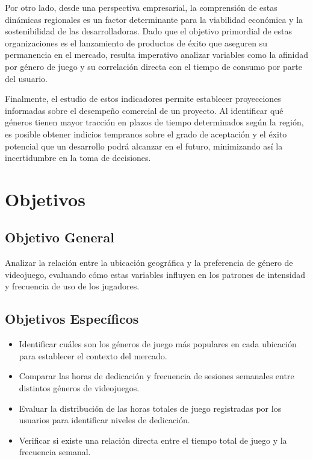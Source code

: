 \documentclass[oneside,11pt]{Latex/Classes/PhDthesisPSnPDF}
\begin{document}
Por otro lado, desde una perspectiva empresarial, la comprensión de
estas dinámicas regionales es un factor determinante para la viabilidad
económica y la sostenibilidad de las desarrolladoras. Dado que el
objetivo primordial de estas organizaciones es el lanzamiento de
productos de éxito que aseguren su permanencia en el mercado, resulta
imperativo analizar variables como la afinidad por género de juego y su
correlación directa con el tiempo de consumo por parte del usuario.

Finalmente, el estudio de estos indicadores permite establecer
proyecciones informadas sobre el desempeño comercial de un proyecto. Al
identificar qué géneros tienen mayor tracción en plazos de tiempo
determinados según la región, es posible obtener indicios tempranos
sobre el grado de aceptación y el éxito potencial que un desarrollo
podrá alcanzar en el futuro, minimizando así la incertidumbre en la toma
de decisiones.

\section{Objetivos}

\subsection{Objetivo General}

Analizar la relación entre la ubicación geográfica y la preferencia de
género de videojuego, evaluando cómo estas variables influyen en los
patrones de intensidad y frecuencia de uso de los jugadores.

\subsection{Objetivos Específicos}
\begin{itemize}
  \item{Identificar cuáles son los géneros de juego más populares en cada ubicación para establecer el contexto del mercado.}
  \item{Comparar las horas de dedicación y frecuencia de sesiones semanales entre distintos géneros de videojuegos.}
  \item{Evaluar la distribución de las horas totales de juego registradas por los usuarios para identificar niveles de dedicación.}
  \item{Verificar si existe una relación directa entre el tiempo total de juego y la frecuencia semanal.}
\end{itemize}
\end{document}
